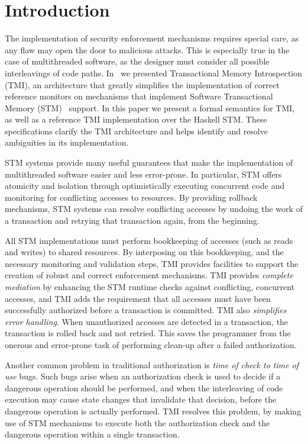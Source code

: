 \section{Introduction} %
\label{sec:introduction}

The implementation of security enforcement mechanisms requires special care,
as any flaw may open the door to malicious attacks. This is especially true
in the case of multithreaded software, as the designer must consider all possible
interleavings of code paths. In~\cite{tmi} we presented Transactional Memory Introspection
(TMI), an architecture that greatly simplifies the implementation of correct
reference monitors on 
mechanisms that
implement Software Transactional Memory (STM)~\cite{harrisFraserSTM,hm93} support.
%
In this paper we present a formal semantics for TMI,
    as well as a reference TMI implementation over the Haskell STM.
These specifications clarify the TMI architecture
    and helps identify and resolve ambiguities 
    in its implementation.


STM systems provide many useful guarantees that make the implementation of multithreaded
software easier and less error-prone. In particular, STM offers 
atomicity and isolation
through optimistically executing concurrent code and monitoring
for conflicting accesses to resources.
By providing
rollback mechanisms, STM systems can resolve conflicting accesses by undoing the work of a transaction
and retrying that transaction again, from the beginning.

All STM implementations must perform bookkeeping of accesses (such as reads and writes)
to shared resources. By interposing on 
this bookkeeping, and the necessary monitoring and validation steps,
TMI provides facilities to support the creation of robust and correct
enforcement mechanisms. 
TMI provides \emph{complete mediation} by enhancing the STM
runtime checks against conflicting, concurrent accesses, and TMI
adds the requirement that all accesses must have been successfully
authorized before a transaction is committed.
TMI also \emph{simplifies error handling}. When unauthorized accesses are detected in a transaction,
the transaction is rolled back and not retried. 
This saves the programmer from the onerous and error-prone task of performing clean-up after
a failed authorization.

Another common problem in traditional authorization is {\em time of check to time of use} bugs.
Such bugs arise when an authorization check is used to decide if a
dangerous operation should be performed, and when the interleaving
of code execution may cause state changes that invalidate that
decision, before the dangerous operation is actually performed.
TMI resolves this problem, by making use of STM mechanisms to
execute both the authorization check and the dangerous operation
within a single transaction.


